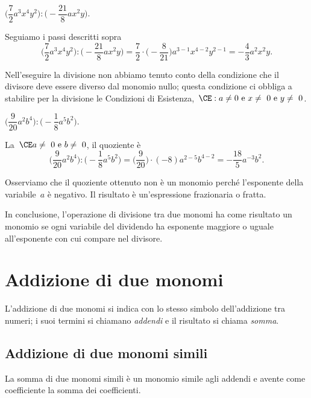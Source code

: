 \begin{exrig}
 \begin{esempio}
$\bigg(\dfrac{7}{2}a^{3}x^{{4}}y^{2}\bigg):\bigg(-{\dfrac{21}{8}}ax^{2}y\bigg)$.

Seguiamo i passi descritti sopra
\[\bigg(\frac{7}{2}a^{3}x^{{4}}y^{2}\bigg):\bigg(-{\frac{21}{8}}ax^{2}y\bigg)=\frac{7}{2}\cdot%
\bigg(-{\frac{8}{21}}\bigg)a^{3-1}x^{4-2}y^{2-1}=-{\frac{4}{3}}a^{2}x^{2}y.\]

Nell'eseguire la divisione non abbiamo tenuto conto
della condizione che il divisore deve essere diverso dal monomio nullo;
questa condizione ci obbliga a stabilire per la divisione le Condizioni
di Esistenza,~$\CE:a\neq0\text{ e }x\neq~0\text{ e }y\neq~0$.
 \end{esempio}

 \begin{esempio}
$\bigg(\dfrac{9}{20}a^{2}b^{4}\bigg):\bigg(-{\dfrac{1}{8}}a^{5}b^{2}\bigg)$.

La~$\CE a\neq~0\text{ e }b\neq~0$, il quoziente è
\[\bigg(\frac{9}{20}a^{2}b^{4}\bigg):\bigg(-{\frac{1}{8}}a^{5}b^{2}\bigg)=%
\bigg(\frac{9}{20}\bigg)\cdot(-8)a^{2-5}b^{4-2}=-{\frac{18}{5}}a^{-3}b^{2}.\]

Osserviamo che il quoziente ottenuto non è un monomio perché
l'esponente della variabile~$a$ è negativo. Il
risultato è un'espressione frazionaria o fratta.
 \end{esempio}
\end{exrig}

In conclusione, l'operazione di divisione tra due monomi
ha come risultato un monomio se ogni variabile del dividendo ha
esponente maggiore o uguale all'esponente con cui
compare nel divisore.


\vspazio\ovalbox{\risolvii \ref{ese:9.21}, \ref{ese:9.22}, \ref{ese:9.23}}

\section{Addizione di due monomi}

L'addizione di due monomi si indica con lo stesso
simbolo dell'addizione tra numeri; i suoi termini si
chiamano \emph{addendi} e il risultato si chiama \emph{somma}.

\subsection{Addizione di due monomi simili}

La somma di due monomi simili è un monomio simile agli addendi e
avente come coefficiente la somma dei coefficienti.

